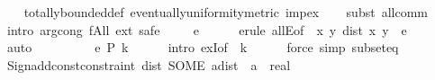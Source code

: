 \begin{isabellebody}
%
\isadelimproof
\ \ %
\endisadelimproof
%
\isatagproof
{}\isamarkupfalse%
\ totally{\isacharunderscore}{\kern0pt}bounded{\isacharunderscore}{\kern0pt}def\ eventually{\isacharunderscore}{\kern0pt}uniformity{\isacharunderscore}{\kern0pt}metric\ imp{\isacharunderscore}{\kern0pt}ex\isanewline
\ \ \isamarkupfalse%
\ {\isacharparenleft}{\kern0pt}subst\ all{\isacharunderscore}{\kern0pt}comm{\isacharparenright}{\kern0pt}\isanewline
\ \ \isamarkupfalse%
\ {\isacharparenleft}{\kern0pt}intro\ arg{\isacharunderscore}{\kern0pt}cong{\isacharbrackleft}{\kern0pt}\ f{\isacharequal}{\kern0pt}All{\isacharbrackright}{\kern0pt}\ ext{\isacharcomma}{\kern0pt}\ safe{\isacharparenright}{\kern0pt}\isanewline
\ \ \isamarkupfalse%
\ \ e\isanewline
\ \ \ \ \isamarkupfalse%
\ {\isacharparenleft}{\kern0pt}erule\ allE{\isacharbrackleft}{\kern0pt}of\ {\isacharunderscore}{\kern0pt}\ {\isachardoublequoteopen}{\isasymlambda}{\isacharparenleft}{\kern0pt}x{\isacharcomma}{\kern0pt}\ y{\isacharparenright}{\kern0pt}{\isachardot}{\kern0pt}\ dist\ x\ y\ {\isacharless}{\kern0pt}\ e{\isachardoublequoteclose}{\isacharbrackright}{\kern0pt}{\isacharparenright}{\kern0pt}\isanewline
\ \ \ \ \isamarkupfalse%
\ auto\isanewline
\ \ \ \ \isamarkupfalse%
\isanewline
\ \ \isamarkupfalse%
\ \ e\ P\ k\isanewline
\ \ \ \ \isamarkupfalse%
\ {\isacharparenleft}{\kern0pt}intro\ exI{\isacharbrackleft}{\kern0pt}of\ {\isacharunderscore}{\kern0pt}\ k{\isacharbrackright}{\kern0pt}{\isacharparenright}{\kern0pt}\isanewline
\ \ \ \ \isamarkupfalse%
\ {\isacharparenleft}{\kern0pt}force\ simp{\isacharcolon}{\kern0pt}\ subset{\isacharunderscore}{\kern0pt}eq{\isacharparenright}{\kern0pt}\isanewline
\ \ \ \ \isamarkupfalse%
\isanewline
\ \ \isamarkupfalse%
%
\endisatagproof
{\isafoldproof}%
%
\isadelimproof
\isanewline
%
\endisadelimproof
\isanewline
%
\isadelimML
\isanewline
%
\endisadelimML
%
\isatagML
{}\isamarkupfalse%
\ {\isacartoucheopen}Sign{\isachardot}{\kern0pt}add{\isacharunderscore}{\kern0pt}const{\isacharunderscore}{\kern0pt}constraint\ {\isacharparenleft}{\kern0pt}\isactrlconstUNDERSCOREname {\isasymopen}dist{\isasymclose}{\isacharcomma}{\kern0pt}\ SOME\ \isactrltyp {\isasymopen}{\isacharprime}{\kern0pt}a{\isacharcolon}{\kern0pt}{\isacharcolon}{\kern0pt}dist\ {\isasymRightarrow}\ {\isacharprime}{\kern0pt}a\ {\isasymRightarrow}\ real{\isasymclose}{\isacharparenright}{\kern0pt}{\isacartoucheclose}%

\end{isabellebody}
